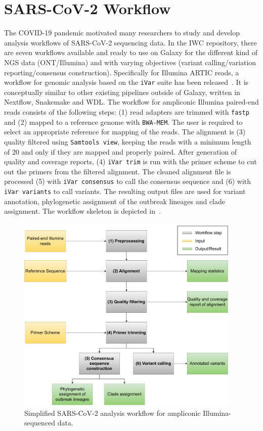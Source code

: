 \section{SARS-CoV-2 Workflow}
The \ac{COVID-19} pandemic motivated many researchers to study and develop analysis workflows of \ac{SARS-CoV-2} sequencing data. In the \ac{IWC} repository, there are seven workflows available and ready to use on Galaxy for the different kind of \ac{NGS} data (ONT/Illumina) and with varying objectives (variant calling/variation reporting/consensus construction). Specifically for Illumina ARTIC reads, a workflow for genomic analysis based on the \texttt{iVar} suite has been released~\cite{iwc2021covidivar}. It is conceptually similar to other existing pipelines outside of Galaxy, written in Nextflow, Snakemake and \ac{WDL}. The workflow for ampliconic Illumina paired-end reads consists of the following steps: (1) read adapters are trimmed with \texttt{fastp} and (2) mapped to a reference genome with \texttt{BWA-MEM}. The user is required to select an appropriate reference for mapping of the reads. The alignment is (3) quality filtered using \texttt{Samtools view}, keeping the reads with a minimum length of 20 and only if they are mapped and properly paired. After generation of quality and coverage reports, (4) \texttt{iVar trim} is run with the primer scheme to cut out the primers from the filtered alignment. The cleaned alignment file is processed (5) with \texttt{iVar consensus} to call the consensus sequence and (6) with \texttt{iVar variants} to call variants. The resulting output files are used for variant annotation, phylogenetic assignment of the outbreak lineages and clade assignment. The workflow skeleton is depicted in~. 

\begin{figure}[h!]
	\includegraphics[width=0.95\textwidth]{media/3-sars-cov-2.pdf}
	\caption{Simplified SARS-CoV-2 analysis workflow for ampliconic Illumina-sequenced data.}
	\label{fig:3-sars-wf}
\end{figure}

